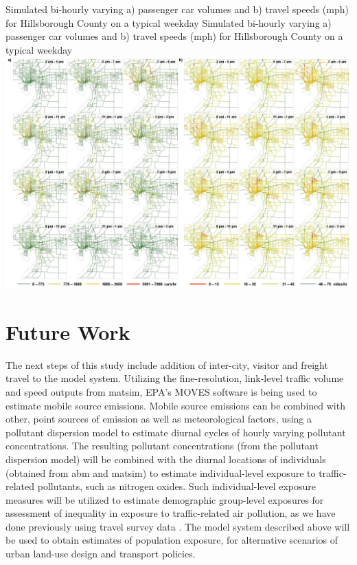 \createfigure%
{Simulated bi-hourly varying a) passenger car volumes and b) travel speeds (mph) for Hillsborough County on a typical weekday}%
{Simulated bi-hourly varying a) passenger car volumes and b) travel speeds (mph) for Hillsborough County on a typical weekday}%
{\label{fig:tampa-fig3}}%
{\includegraphics[width=1.5\textwidth, angle=90]{./scenarios/figures/tampa-fig3.jpg}}%
{}

\section{Future Work}
The next steps of this study include addition of inter-city, visitor and freight travel to the model system. 
Utilizing the fine-resolution, link-level traffic volume and speed outputs from \gls{matsim}, EPA’s MOVES software is being used to estimate mobile source emissions. 
Mobile source emissions can be combined with other, point sources of emission as well as meteorological factors, using a pollutant dispersion model to estimate diurnal cycles of hourly varying pollutant concentrations. 
The resulting pollutant concentrations (from the pollutant dispersion model) will be combined with the diurnal locations of individuals (obtained from \gls{abm} and \gls{matsim}) to estimate individual-level exposure to traffic-related pollutants, such as nitrogen oxides. 
Such individual-level exposure measures will be utilized to estimate demographic group-level exposures for assessment of inequality in exposure to traffic-related air pollution, as we have done previously using travel survey data \citep[][]{GurramEtAl_AQAH_2015}. 
The model system described above will be used to obtain estimates of population exposure, for alternative scenarios of urban land-use design and transport policies.

